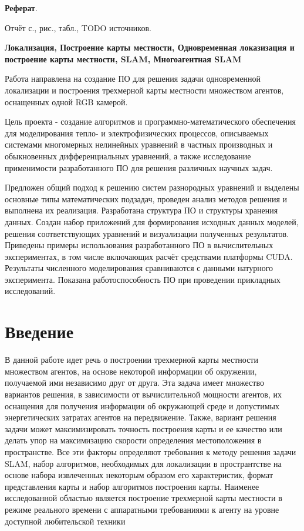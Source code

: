 



\textbf{\large{Реферат}}.

Отчёт \pageref{LastPage}с., \totalfigures рис., \totaltables табл., 
TODO источников.

\noindent \textbf{ Локализация, Построение карты местности, Одновременная локазизация и построение карты местности, SLAM, Многоагентная SLAM }

Работа направлена на создание ПО для решения задачи одновременной локализации и построения трехмерной карты местности множеством агентов, оснащенных одной RGB камерой.

Цель проекта - создание алгоритмов и программно-математического 
обеспечения для моделирования тепло- и электрофизических процессов, описываемых 
системами многомерных нелинейных уравнений в частных производных и обыкновенных 
дифференциальных уравнений, а также исследование применимости разработанного ПО 
для решения различных научных задач.

Предложен общий подход к решению систем разнородных 
уравнений и выделены основные типы математических подзадач, 
проведен анализ методов решения и выполнена их реализация. Разработана 
структура ПО и структуры хранения данных. Создан набор приложений для 
формирования исходных данных моделей, решения соответствующих уравнений и 
визуализации полученных 
результатов. Приведены примеры использования разработанного ПО в вычислительных 
экспериментах, в том числе включающих расчёт средствами платформы CUDA. 
Результаты численного моделирования сравниваются с данными натурного 
эксперимента.
Показана работоспособность ПО при проведении прикладных исследований.

\setcounter{page}{5}
\tableofcontents

\section{Введение}
В данной работе идет речь о построении трехмерной карты местности множеством агентов, на основе некоторой информации об окружении, получаемой ими независимо друг от друга. Эта задача имеет множество
вариантов решения, в зависимости от вычислительной мощности агентов, их оснащения для получения информации об окружающей среде и допустимых энергетических затратах агентов на передвижение. Также, вариант решения задачи может максимизировать точность построения карты и ее качество или делать упор на максимизацию скорости определения местоположения в пространстве. Все эти факторы определяют требования к методу
решения задачи SLAM, набор алгоритмов, необходимых для локализации в пространтстве на основе набора извлеченных некоторым образом его характеристик, формат представления карты и набор алгоритмов построения карты. Наименее исследованной областью является построение трехмерной карты местности в режиме реального времени с аппаратными требованиями к агенту на уровне доступной любительской техники~\cite{SLAMoverview}


